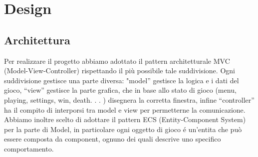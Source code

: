 \chapter{Design}

\section{Architettura}
Per realizzare il progetto abbiamo adottato il pattern architetturale MVC (Model-View-Controller) rispettando il più possibile tale suddivisione. 
Ogni suddivisione gestisce una parte diversa: "model” gestisce la logica e i dati del gioco, “view” gestisce la parte grafica, che in base allo stato di gioco (menu, playing, settings, win, death. . . ) disegnera la corretta finestra, infine “controller” ha il compito di interporsi tra model e view per permetterne la comunicazione. 
Abbiamo inoltre scelto di adottare il pattern ECS (Entity-Component System) per la parte di Model, in particolare ogni oggetto di gioco é un’entita che può essere composta da component, ognuno dei quali descrive uno specifico comportamento. 

